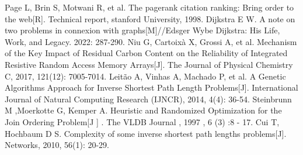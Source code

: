 \clearpage
{}
{}
\begin{thebibliography}{99}
	Page L, Brin S, Motwani R, et al. The pagerank citation ranking: Bring order to the web[R]. Technical report, stanford University, 1998.
	Dijkstra E W. A note on two problems in connexion with graphs[M]//Edsger Wybe Dijkstra: His Life, Work, and Legacy. 2022: 287-290.
	Niu G, Cartoixà X, Grossi A, et al. Mechanism of the Key Impact of Residual Carbon Content on the Reliability of Integrated Resistive Random Access Memory Arrays[J]. The Journal of Physical Chemistry C, 2017, 121(12): 7005-7014.
	Leitão A, Vinhas A, Machado P, et al. A Genetic Algorithms Approach for Inverse Shortest Path Length Problems[J]. International Journal of Natural Computing Research (IJNCR), 2014, 4(4): 36-54.
	Steinbrunn M ,Moerkotte G, Kemper A. Heuristic and Randomized Optimization for the Join Ordering Problem[J ] . The VLDB Journal , 1997 , 6 (3) :8 - 17.
	Cui T, Hochbaum D S. Complexity of some inverse shortest path lengths problems[J]. Networks, 2010, 56(1): 20-29.
\end{thebibliography}